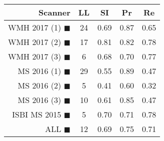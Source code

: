 \begin{tabular}{rcccc}
\toprule
Scanner & LL & SI & Pr & Re \\
\midrule
WMH 2017 (1) {\color[rgb]{ 1.00 0.00 0.00}$\blacksquare$} & 24 & 0.69 & 0.87 & 0.65 \\
WMH 2017 (2) {\color[rgb]{ 1.00 0.50 0.00}$\blacksquare$} & 17 & 0.81 & 0.82 & 0.78 \\
WMH 2017 (3) {\color[rgb]{ 1.00 0.80 0.00}$\blacksquare$} & 6 & 0.68 & 0.70 & 0.77 \\
MS  2016 (1) {\color[rgb]{ 0.20 0.80 0.00}$\blacksquare$} & 29 & 0.55 & 0.89 & 0.47 \\
MS  2016 (2) {\color[rgb]{ 0.00 0.40 1.00}$\blacksquare$} & 5 & 0.41 & 0.60 & 0.32 \\
MS  2016 (3) {\color[rgb]{ 0.60 0.00 1.00}$\blacksquare$} & 10 & 0.61 & 0.85 & 0.47 \\
ISBI MS 2015 {\color[rgb]{ 1.00 0.00 1.00}$\blacksquare$} & 5 & 0.70 & 0.71 & 0.78 \\
\midrule
ALL {\color[rgb]{ 1.00 1.00 1.00}$\blacksquare$} & 12 & 0.69 & 0.75 & 0.71 \\
\bottomrule
\end{tabular}